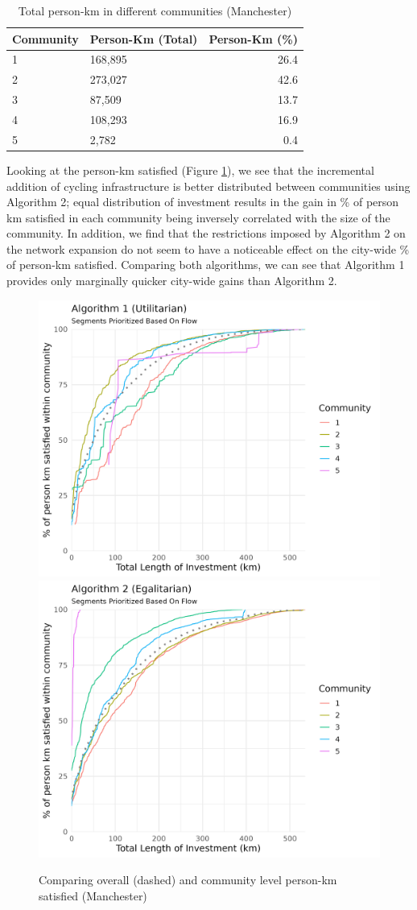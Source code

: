 \documentclass[
]{article}
\begin{document}
\begin{table}[!h]

\caption{\label{tab:personkmtable}Total person-km in different communities (Manchester)}
\centering
\begin{tabular}[t]{l|l|r}
\hline
Community & Person-Km (Total) & Person-Km (\%)\\
\hline
1 & 168,895 & 26.4\\
\hline
2 & 273,027 & 42.6\\
\hline
3 & 87,509 & 13.7\\
\hline
4 & 108,293 & 16.9\\
\hline
5 & 2,782 & 0.4\\
\hline
\end{tabular}
\end{table}

Looking at the person-km satisfied (Figure \ref{fig:growthtotal}), we see that the incremental addition of cycling infrastructure is better distributed between communities using Algorithm 2; equal distribution of investment results in the gain in \% of person km satisfied in each community being inversely correlated with the size of the community.
In addition, we find that the restrictions imposed by Algorithm 2 on the network expansion do not seem to have a noticeable effect on the city-wide \% of person-km satisfied.
Comparing both algorithms, we can see that Algorithm 1 provides only marginally quicker city-wide gains than Algorithm 2.

\begin{figure}

{\centering \includegraphics[width=0.48\linewidth]{data/Manchester/Plots/Growth_Results/growth_utilitarian_satisfied_km_both_flow_column} \includegraphics[width=0.48\linewidth]{data/Manchester/Plots/Growth_Results/growth_egalitarian_satisfied_km_both_flow_column} 

}

\caption{Comparing overall (dashed) and community level person-km satisfied (Manchester)}\label{fig:growthtotal}
\end{figure}
\end{document}
